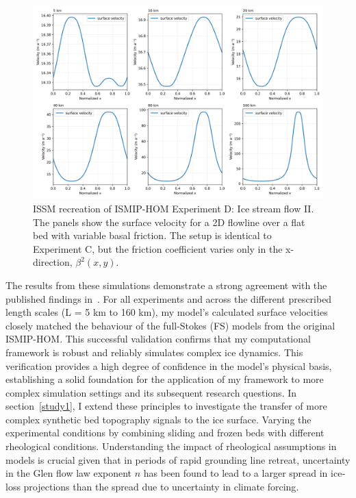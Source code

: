 \begin{figure}[H]
    \includegraphics[scale=0.45]{ExpD_velocity_panels.png}
    \caption{ ISSM recreation of ISMIP-HOM Experiment D: Ice stream flow II. The panels show the surface velocity for a 2D flowline over a flat bed with variable basal friction. The setup is identical to Experiment C, but the friction coefficient varies only in the x-direction, $\beta^{2}(x,y)$.}
    \label{fig:4.4}
\end{figure}

The results from these simulations demonstrate a strong agreement with the published findings in~\cite{Pattyn_2008}. For all experiments and across the different prescribed length scales (L = 5 km to 160 km), my model's calculated surface velocities closely matched the behaviour of the full-Stokes (FS) models from the original ISMIP-HOM. This successful validation confirms that my computational framework is robust and reliably simulates complex ice dynamics. This verification provides a high degree of confidence in the model's physical basis, establishing a solid foundation for the application of my framework to more complex simulation settings and its subsequent research questions. In section~\ref{study1}, I extend these principles to investigate the transfer of more complex synthetic bed topography signals to the ice surface. Varying the experimental conditions by combining sliding and frozen beds with different rheological conditions. Understanding the impact of rheological assumptions in models is crucial given that in periods of rapid grounding line retreat, uncertainty in the Glen flow law exponent $n$ has been found to lead to a larger spread in ice‐loss projections than the spread due to uncertainty in climate forcing\cite{Getraer_2025}.


